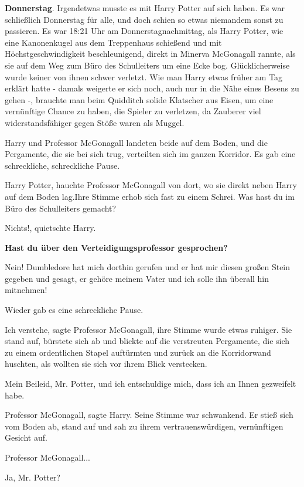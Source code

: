 \textbf{Donnerstag}. Irgendetwas musste es mit Harry Potter auf sich haben. Es
war schließlich Donnerstag für alle, und doch schien so etwas niemandem sonst zu
passieren. Es war 18:21 Uhr am Donnerstagnachmittag, als Harry Potter, wie eine
Kanonenkugel aus dem Treppenhaus schießend und mit Höchstgeschwindigkeit
beschleunigend, direkt in Minerva McGonagall rannte, als sie auf dem Weg zum
Büro des Schulleiters um eine Ecke bog. Glücklicherweise wurde keiner von ihnen
schwer verletzt. Wie man Harry etwas früher am Tag erklärt hatte - damals
weigerte er sich noch, auch nur in die Nähe eines Besens zu gehen -, brauchte
man beim Quidditch solide Klatscher aus Eisen, um eine vernünftige Chance zu
haben, die Spieler zu verletzen, da Zauberer viel widerstandsfähiger gegen Stöße
waren als Muggel.

Harry und Professor McGonagall landeten beide auf dem Boden, und die Pergamente,
die sie bei sich trug, verteilten sich im ganzen Korridor. Es gab eine
schreckliche, schreckliche Pause.

\glqq Harry Potter\grqq{}, hauchte Professor McGonagall von dort, wo sie direkt
neben Harry auf dem Boden lag.Ihre Stimme erhob sich fast zu einem Schrei. \glqq
Was hast du im Büro des Schulleiters gemacht?\grqq{}

\glqq Nichts!\grqq{}, quietschte Harry.

\textbf{\glqq Hast du über den Verteidigungsprofessor gesprochen?\grqq{} }

\glqq Nein! Dumbledore hat mich dorthin gerufen und er hat mir diesen großen
Stein gegeben und gesagt, er gehöre meinem Vater und ich solle ihn überall hin
mitnehmen!\grqq{}

Wieder gab es eine schreckliche Pause.

\glqq Ich verstehe\grqq{}, sagte Professor McGonagall, ihre Stimme wurde etwas
ruhiger. Sie stand auf, bürstete sich ab und blickte auf die verstreuten
Pergamente, die sich zu einem ordentlichen Stapel auftürmten und zurück an die
Korridorwand huschten, als wollten sie sich vor ihrem Blick verstecken.

\glqq Mein Beileid, Mr. Potter, und ich entschuldige mich, dass ich an Ihnen
gezweifelt habe.\grqq{}

\glqq Professor McGonagall\grqq{}, sagte Harry. Seine Stimme war schwankend. Er
stieß sich vom Boden ab, stand auf und sah zu ihrem vertrauenswürdigen,
vernünftigen Gesicht auf.

\glqq Professor McGonagall...\grqq{}

\glqq Ja, Mr. Potter?\grqq{}

